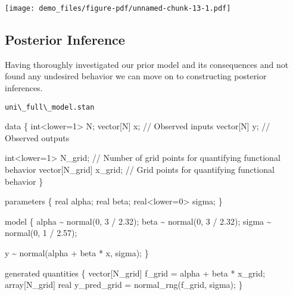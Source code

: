 \documentclass[
  letterpaper,
  DIV=11,
  numbers=noendperiod]{scrartcl}
\newenvironment{Shaded}{\begin{snugshade}}{\end{snugshade}}
\newcommand{\CommentTok}[1]{\textcolor[rgb]{0.37,0.37,0.37}{#1}}
\newcommand{\DataTypeTok}[1]{\textcolor[rgb]{0.68,0.00,0.00}{#1}}
\newcommand{\DecValTok}[1]{\textcolor[rgb]{0.68,0.00,0.00}{#1}}
\newcommand{\FloatTok}[1]{\textcolor[rgb]{0.68,0.00,0.00}{#1}}
\newcommand{\KeywordTok}[1]{\textcolor[rgb]{0.00,0.23,0.31}{#1}}
\newcommand{\NormalTok}[1]{\textcolor[rgb]{0.00,0.23,0.31}{#1}}
\begin{document}
\texttt{[image: demo\_files/figure-pdf/unnamed-chunk-13-1.pdf]}

\subsection{Posterior Inference}\label{posterior-inference}

Having thoroughly investigated our prior model and its consequences and
not found any undesired behavior we can move on to constructing
posterior inferences.

\begin{codelisting}

\caption{\texttt{uni\textbackslash\_full\textbackslash\_model.stan}}

\begin{Shaded}
\begin{Highlighting}[]
\KeywordTok{data}\NormalTok{ \{}
  \DataTypeTok{int}\NormalTok{\textless{}}\KeywordTok{lower}\NormalTok{=}\DecValTok{1}\NormalTok{\textgreater{} N;}
  \DataTypeTok{vector}\NormalTok{[N] x; }\CommentTok{// Observed inputs}
  \DataTypeTok{vector}\NormalTok{[N] y; }\CommentTok{// Observed outputs}
  
  \DataTypeTok{int}\NormalTok{\textless{}}\KeywordTok{lower}\NormalTok{=}\DecValTok{1}\NormalTok{\textgreater{} N\_grid; }\CommentTok{// Number of grid points for quantifying functional behavior}
  \DataTypeTok{vector}\NormalTok{[N\_grid] x\_grid; }\CommentTok{// Grid points for quantifying functional behavior}
\NormalTok{\}}

\KeywordTok{parameters}\NormalTok{ \{ }
  \DataTypeTok{real}\NormalTok{ alpha;}
  \DataTypeTok{real}\NormalTok{ beta;}
  \DataTypeTok{real}\NormalTok{\textless{}}\KeywordTok{lower}\NormalTok{=}\DecValTok{0}\NormalTok{\textgreater{} sigma;}
\NormalTok{\}}

\KeywordTok{model}\NormalTok{ \{}
\NormalTok{  alpha \textasciitilde{} normal(}\DecValTok{0}\NormalTok{, }\DecValTok{3}\NormalTok{ / }\FloatTok{2.32}\NormalTok{);}
\NormalTok{  beta \textasciitilde{} normal(}\DecValTok{0}\NormalTok{, }\DecValTok{3}\NormalTok{ / }\FloatTok{2.32}\NormalTok{);}
\NormalTok{  sigma \textasciitilde{} normal(}\DecValTok{0}\NormalTok{, }\DecValTok{1}\NormalTok{ / }\FloatTok{2.57}\NormalTok{);}
  
\NormalTok{  y \textasciitilde{} normal(alpha + beta * x, sigma);}
\NormalTok{\}}

\KeywordTok{generated quantities}\NormalTok{ \{}
  \DataTypeTok{vector}\NormalTok{[N\_grid] f\_grid = alpha + beta * x\_grid;}
  \DataTypeTok{array}\NormalTok{[N\_grid] }\DataTypeTok{real}\NormalTok{ y\_pred\_grid = normal\_rng(f\_grid, sigma);}
\NormalTok{\}}
\end{Highlighting}
\end{Shaded}

\end{codelisting}
\end{document}
